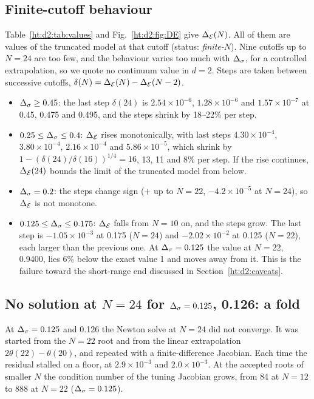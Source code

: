 \subsection{Finite-cutoff behaviour}\label{ht:d2:finiteN}
Table~\ref{ht:d2:tab:values} and Fig.~\ref{ht:d2:fig:DE} give $\Delta_{\mathcal E}(N)$. All of them are values of the truncated model at that
cutoff (status: \emph{finite-$N$}). Nine cutoffs up to $N=24$ are too few, and the behaviour varies too much with $\Delta_\sigma$,
for a controlled extrapolation, so we quote no continuum value in $d=2$. Steps are taken between successive cutoffs,
$\delta(N)=\Delta_{\mathcal E}(N)-\Delta_{\mathcal E}(N-2)$.
\begin{itemize}
\item $\Delta_\sigma\ge0.45$: the last step $\delta(24)$ is $2.54\times10^{-6}$, $1.28\times10^{-6}$ and $1.57\times10^{-7}$ at
 0.45, 0.475 and 0.495, and the steps shrink by 18--22\% per step.
\item $0.25\le\Delta_\sigma\le0.4$: $\Delta_{\mathcal E}$ rises monotonically, with last steps $4.30\times10^{-4}$, $3.80\times10^{-4}$,
 $2.16\times10^{-4}$ and $5.86\times10^{-5}$, which shrink by $1-(\delta(24)/\delta(16))^{1/4}=16$, 13, 11 and 8\% per
 step. If the rise continues, $\Delta_{\mathcal E}(24)$ bounds the limit of the truncated model from below.
\item $\Delta_\sigma=0.2$: the steps change sign ($+$ up to $N=22$, $-4.2\times10^{-5}$ at $N=24$), so $\Delta_{\mathcal E}$ is not monotone.
\item $0.125\le\Delta_\sigma\le0.175$: $\Delta_{\mathcal E}$ falls from $N=10$ on, and the steps grow. The last step is $-1.05\times10^{-3}$ at
 0.175 ($N=24$) and $-2.02\times10^{-2}$ at 0.125 ($N=22$), each larger than the previous one. At $\Delta_\sigma=0.125$ the value
 at $N=22$, 0.9400, lies $6\%$ below the exact value 1 and moves away from it. This is the failure toward the
 short-range end discussed in Section~\ref{ht:d2:caveats}.
\end{itemize}

\subsection{No solution at \texorpdfstring{$N=24$}{N=24} for \texorpdfstring{$\Delta_\sigma=0.125$, 0.126}{small Delta sigma}: a fold}\label{ht:d2:fold}
At $\Delta_\sigma=0.125$ and 0.126 the Newton solve at $N=24$ did not converge. It was started from the $N=22$ root and from the
linear extrapolation $2\theta(22)-\theta(20)$, and repeated with a finite-difference Jacobian. Each time the residual
stalled on a floor, at $2.9\times10^{-3}$ and $2.0\times10^{-3}$. At the accepted roots of smaller $N$ the condition
number of the tuning Jacobian grows, from 84 at $N=12$ to 888 at $N=22$ ($\Delta_\sigma=0.125$).

